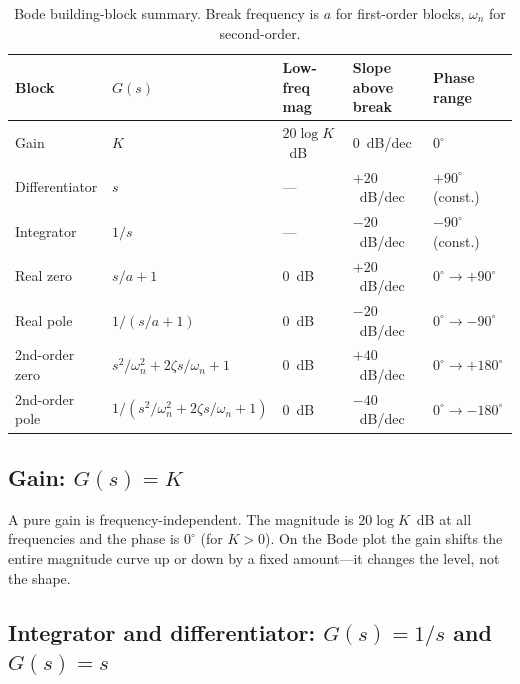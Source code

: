 \documentclass[12pt]{article}
\begin{document}
\begin{table}[htbp]
\centering
\caption{Bode building-block summary.  Break frequency is $a$ for first-order
  blocks, $\omega_n$ for second-order.}
\label{tab:building_blocks}
\begin{tabular}{@{}lllll@{}}
\toprule
Block & $G(s)$ & Low-freq mag & Slope above break & Phase range \\
\midrule
Gain          & $K$                     & $20\log K$~dB & 0~dB/dec      & $0^\circ$ \\
Differentiator & $s$                   & ---           & $+20$~dB/dec  & $+90^\circ$ (const.) \\
Integrator    & $1/s$                   & ---           & $-20$~dB/dec  & $-90^\circ$ (const.) \\
Real zero     & $s/a + 1$               & 0~dB          & $+20$~dB/dec  & $0^\circ \to +90^\circ$ \\
Real pole     & $1/(s/a + 1)$           & 0~dB          & $-20$~dB/dec  & $0^\circ \to -90^\circ$ \\
2nd-order zero & $s^2/\omega_n^2 + 2\zeta s/\omega_n + 1$ & 0~dB & $+40$~dB/dec & $0^\circ \to +180^\circ$ \\
2nd-order pole & $1/(s^2/\omega_n^2 + 2\zeta s/\omega_n + 1)$ & 0~dB & $-40$~dB/dec & $0^\circ \to -180^\circ$ \\
\bottomrule
\end{tabular}
\end{table}

\subsection{Gain: \texorpdfstring{$G(s) = K$}{G(s) = K}}
\label{sec:gain_block}

A pure gain is frequency-independent.  The magnitude is $20\log K$~dB at all
frequencies and the phase is $0^\circ$ (for $K > 0$).  On the Bode plot the
gain shifts the entire magnitude curve up or down by a fixed amount---it
changes the level, not the shape.

\subsection{Integrator and differentiator: \texorpdfstring{$G(s) = 1/s$
and $G(s) = s$}{G(s) = 1/s and G(s) = s}}
\label{sec:integrator}
\end{document}
